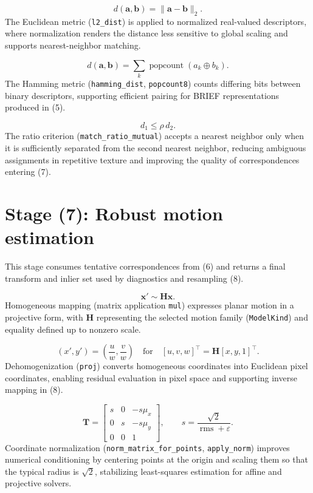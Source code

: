 \documentclass[11pt]{article}
\begin{document}
\begin{equation}
d(\mathbf{a},\mathbf{b})=\lVert \mathbf{a}-\mathbf{b}\rVert_2.
\end{equation}
The Euclidean metric (\texttt{l2\_dist}) is applied to normalized real-valued descriptors, where normalization renders the distance less sensitive to global scaling and supports nearest-neighbor matching.

\begin{equation}
d(\mathbf{a},\mathbf{b})=\sum_{k}\operatorname{popcount}(a_k\oplus b_k).
\end{equation}
The Hamming metric (\texttt{hamming\_dist}, \texttt{popcount8}) counts differing bits between binary descriptors, supporting efficient pairing for BRIEF representations produced in (5).

\begin{equation}
d_{1}\le \rho\, d_{2}.
\end{equation}
The ratio criterion (\texttt{match\_ratio\_mutual}) accepts a nearest neighbor only when it is sufficiently separated from the second nearest neighbor, reducing ambiguous assignments in repetitive texture and improving the quality of correspondences entering (7).

\section*{Stage (7): Robust motion estimation}
This stage consumes tentative correspondences from (6) and returns a final transform and inlier set used by diagnostics and resampling (8).

\begin{equation}
\mathbf{x}' \sim \mathbf{H}\mathbf{x}.
\end{equation}
Homogeneous mapping (matrix application \texttt{mul}) expresses planar motion in a projective form, with $\mathbf{H}$ representing the selected motion family (\texttt{ModelKind}) and equality defined up to nonzero scale.

\begin{equation}
(x',y')=\left(\frac{u}{w},\frac{v}{w}\right)\quad \text{for}\quad [u,v,w]^{\top}=\mathbf{H}[x,y,1]^{\top}.
\end{equation}
Dehomogenization (\texttt{proj}) converts homogeneous coordinates into Euclidean pixel coordinates, enabling residual evaluation in pixel space and supporting inverse mapping in (8).

\begin{equation}
\mathbf{T}=
\begin{bmatrix}
s&0&-s\mu_x\\
0&s&-s\mu_y\\
0&0&1
\end{bmatrix},
\qquad
s=\frac{\sqrt{2}}{\operatorname{rms}+\varepsilon}.
\end{equation}
Coordinate normalization (\texttt{norm\_matrix\_for\_points}, \texttt{apply\_norm}) improves numerical conditioning by centering points at the origin and scaling them so that the typical radius is $\sqrt{2}$, stabilizing least-squares estimation for affine and projective solvers.
\end{document}
